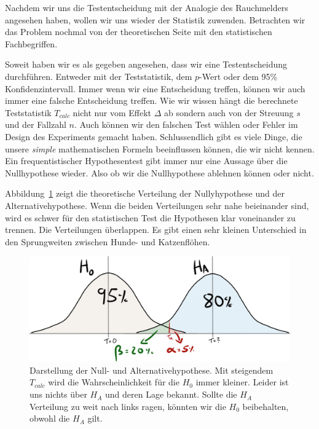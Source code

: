 \documentclass[
  letterpaper,
]{scrbook}
\begin{document}
Nachdem wir uns die Testentscheidung mit der Analogie des Rauchmelders
angesehen haben, wollen wir uns wieder der Statistik zuwenden.
Betrachten wir das Problem nochmal von der theoretischen Seite mit den
statistischen Fachbegriffen.

Soweit haben wir es als gegeben angesehen, dass wir eine
Testentscheidung durchführen. Entweder mit der Teststatistik, dem
\(p\)-Wert oder dem 95\% Konfidenzintervall. Immer wenn wir eine
Entscheidung treffen, können wir auch immer eine falsche Entscheidung
treffen. Wie wir wissen hängt die berechnete Teststatistik \(T_{calc}\)
nicht nur vom Effekt \(\Delta\) ab sondern auch von der Streuung \(s\)
und der Fallzahl \(n\). Auch können wir den falschen Test wählen oder
Fehler im Design des Experiments gemacht haben. Schlussendlich gibt es
viele Dinge, die unsere \emph{simple} mathematischen Formeln
beeinflussen können, die wir nicht kennen. Ein frequentistischer
Hypothesentest gibt immer nur eine Aussage über die Nullhypothese
wieder. Also ob wir die Nullhypothese ablehnen können oder nicht.

Abbildung~\ref{fig-teststatistik-03} zeigt die theoretische Verteilung
der Nullyhypothese und der Alternativehypothese. Wenn die beiden
Verteilungen sehr nahe beieinander sind, wird es schwer für den
statistischen Test die Hypothesen klar voneinander zu trennen. Die
Verteilungen überlappen. Es gibt einen sehr kleinen Unterschied in den
Sprungweiten zwischen Hunde- und Katzenflöhen.

\begin{figure}

{\centering \includegraphics{./images/t-verteilung_03.png}

}

\caption{\label{fig-teststatistik-03}Darstellung der Null- und
Alternativehypothese. Mit steigendem \(T_{calc}\) wird die
Wahrscheinlichkeit für die \(H_0\) immer kleiner. Leider ist uns nichts
über \(H_A\) und deren Lage bekannt. Sollte die \(H_A\) Verteilung zu
weit nach links ragen, könnten wir die \(H_0\) beibehalten, obwohl die
\(H_A\) gilt.}

\end{figure}
\end{document}
